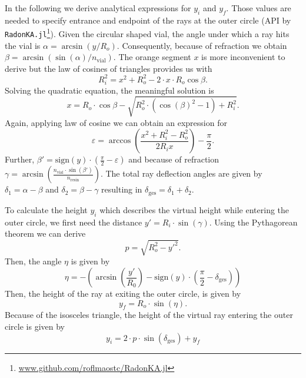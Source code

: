 \documentclass{article}
\begin{document}
\noindent In the following we derive analytical expressions for $y_i$ and $y_f$. 
Those values are needed to specify entrance and endpoint of the rays at the outer circle (API by \texttt{RadonKA.jl}\footnote{\url{www.github.com/roflmaostc/RadonKA.jl}}).
Given the circular shaped vial, the angle under which a ray hits the vial is $\alpha = \arcsin(y / R_o)$. Consequently, because of refraction we obtain $\beta=\arcsin(\sin(\alpha) / n_\text{vial})$.
The orange segment $x$ is more inconvenient to derive but the law of cosines of triangles provides us with 
\begin{equation}
    R_i^2 = x^2 + R_o^2 - 2 \cdot x \cdot R_o \cos{\beta}.
\end{equation}
Solving the quadratic equation, the meaningful solution is
\begin{equation}
    x = R_o \cdot \cos{\beta} -  \sqrt{R_o^2 \cdot (\cos(\beta)^2 - 1) + R_i^2}.
\end{equation}
Again, applying law of cosine we can obtain an expression for
\begin{equation}
    \varepsilon = \arccos\left(\frac{x^2 + R_i^2 - R_o^2}{2 R_i x}\right) - \frac{\pi}{2}.
\end{equation}
Further, $\beta'=\mathrm{sign}(y) \cdot (\frac{\pi}{2}- \varepsilon)$ and because of refraction $\gamma=\arcsin(\frac{n_\text{vial} \cdot \sin(\beta')}{n_\text{resin}})$. 
The total ray deflection angles are given by $\delta_1=\alpha - \beta$ and $\delta_2=\beta-\gamma$ resulting in $\delta_\text{ges} = \delta_1 + \delta_2$. 

\noindent
To calculate the height $y_i$ which describes the virtual height while entering the outer circle, we first need the distance $y' = R_i \cdot \sin(\gamma)$.
Using the Pythagorean theorem we can derive
\begin{equation}
    p = \sqrt{R_o^2-y'^2}.
\end{equation}
Then, the angle $\eta$ is given by
\begin{equation}
    \eta =- \left(\arcsin\left(\frac{y'}{R_0}\right) - \text{sign}(y) \cdot \left(\frac{\pi}{2}-\delta_{\text{ges}}\right)\right)
\end{equation}
Then, the height of the ray at exiting the outer circle, is given by 
\begin{equation}
    y_f = R_o \cdot \sin(\eta). 
\end{equation}
Because of the isosceles triangle, the height of the virtual ray entering the outer circle is given by
\begin{equation}
    y_i =  2\cdot p \cdot \sin(\delta_\text{ges}) + y_f 
\end{equation}
\end{document}

